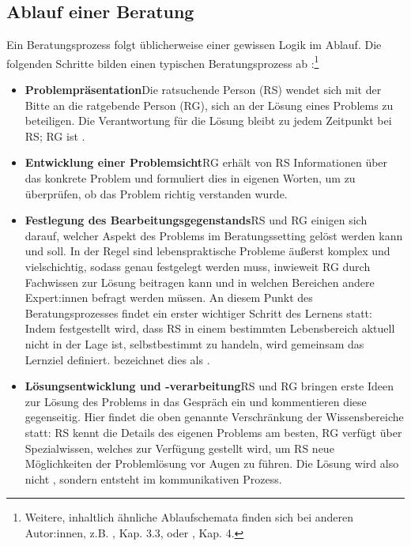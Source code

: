 \documentclass[
  twoside,
  parskip=half-,
  paper=176mm:246mm,
  BCOR=14mm,
  DIV=14,
]{scrreprt}
\begin{document}
\subsection{Ablauf einer Beratung}
Ein Beratungsprozess folgt üblicherweise einer gewissen Logik im Ablauf.  Die folgenden Schritte bilden einen typischen Beratungsprozess ab \autocite[vgl. Kallmeyer 1985, zit. nach][179]{dinkelaker}:\footnote{Weitere, inhaltlich ähnliche Ablaufschemata finden sich bei anderen Autor:innen, z.B. \citeauthor{weinberger}, Kap. 3.3, oder \citeauthor{hacker2021}, Kap. 4.}
\begin{itemize}
  \item \textbf{Problempräsentation}\quad Die ratsuchende Person (RS) wendet sich mit der Bitte an die ratgebende Person (RG), sich an der Lösung eines Problems zu beteiligen. Die Verantwortung für die Lösung bleibt zu jedem Zeitpunkt bei RS; RG ist .
  \item \textbf{Entwicklung einer Problemsicht}\quad RG erhält von RS Informationen über das konkrete Problem und formuliert dies in eigenen Worten, um zu überprüfen, ob das Problem richtig verstanden wurde.
  \item \textbf{Festlegung des Bearbeitungsgegenstands}\quad RS und RG einigen sich darauf, welcher Aspekt des Problems im Beratungssetting gelöst werden kann und soll. In der Regel sind lebenspraktische Probleme äußerst komplex und vielschichtig, sodass genau festgelegt werden muss, inwieweit RG durch Fachwissen zur Lösung beitragen kann und in welchen Bereichen andere Expert:innen befragt werden müssen. An diesem Punkt des Beratungsprozesses findet ein erster wichtiger Schritt des Lernens statt: Indem festgestellt wird, dass RS in einem bestimmten Lebensbereich aktuell nicht in der Lage ist, selbstbestimmt zu handeln, wird gemeinsam das Lernziel definiert. \citeauthor{dinkelaker} bezeichnet dies als .
  \item \textbf{Lösungsentwicklung und -verarbeitung}\quad RS und RG bringen erste Ideen zur Lösung des Problems in das Gespräch ein und kommentieren diese gegenseitig. Hier findet die oben genannte Verschränkung der Wissensbereiche statt: RS kennt die Details des eigenen Problems am besten, RG verfügt über Spezialwissen, welches zur Verfügung gestellt wird, um RS neue Möglichkeiten der Problemlösung vor Augen zu führen. Die Lösung wird also nicht , sondern entsteht im kommunikativen Prozess.

\end{itemize}
\end{document}
